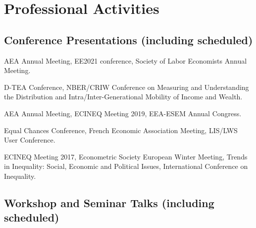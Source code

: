 \documentclass[10pt]{article}
\begin{document}
\section*{Professional Activities}

\subsection*{Conference Presentations (including scheduled)}

\begin{description}[font=\mdseries]
\item[2021]
  AEA Annual Meeting,
  EE2021 conference,
  Society of Labor Economists Annual Meeting.
\item[2020]
	D-TEA Conference,
	NBER/CRIW Conference on Measuring and Understanding the Distribution and Intra/Inter-Generational Mobility of Income and Wealth.
\item[2019]
  AEA Annual Meeting,
  ECINEQ Meeting 2019,
  EEA-ESEM Annual Congress.
\item[2018]
  Equal Chances Conference,
  French Economic Association Meeting,
  LIS/LWS User Conference.
\item[2017]
  ECINEQ Meeting 2017,
  Econometric Society European Winter Meeting,
  Trends in Inequality: Social, Economic and Political Issues, International Conference on Inequality.
\end{description}

\subsection*{Workshop and Seminar Talks (including scheduled)}
\end{document}
